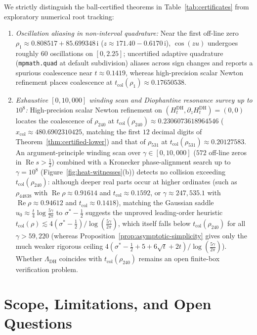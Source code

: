 \documentclass[11pt,a4paper,reqno]{amsart}
\theoremstyle{definition}
\theoremstyle{remark}
\numberwithin{equation}{section}
\newcommand{\ii}{\mathrm{i}}
\DeclareMathOperator{\Reop}{Re}
\begin{document}
We strictly distinguish the ball-certified theorems in Table~\ref{tab:certificates} from exploratory numerical root tracking:
\begin{enumerate}[label=\textup{(\arabic*)},leftmargin=2.0em]
  \item \emph{Oscillation aliasing in non-interval quadrature:} Near the first off-line zero $\rho_1 \approx 0.808517 + 85.699348\,\ii$ ($z \approx 171.40 - 0.6170\,\ii$), $\cos(zu)$ undergoes roughly $60$ oscillations on $[0, 2.25]$; uncertified adaptive quadrature (\texttt{mpmath.quad} at default subdivision) aliases across sign changes and reports a spurious coalescence near $t \approx 0.1419$, whereas high-precision scalar Newton refinement places coalescence at $t_{\mathrm{col}}(\rho_1) \approx 0.17650538$.
  \item \emph{Exhaustive $[0, 10{,}000]$ winding scan and Diophantine resonance survey up to $10^8$:} High-precision scalar Newton refinement on $(H_t^{\mathrm{DH}}, \partial_z H_t^{\mathrm{DH}}) = (0,0)$ locates the coalescence of $\rho_{240}$ at $t_{\mathrm{col}}(\rho_{240}) \approx 0.2306073618964546$ ($x_{\mathrm{col}} \approx 480.6902310425$, matching the first $12$ decimal digits of Theorem~\ref{thm:certified-lower}) and that of $\rho_{531}$ at $t_{\mathrm{col}}(\rho_{531}) \approx 0.20127583$. An argument-principle winding scan over $\gamma \in [0, 10{,}000]$ ($572$ off-line zeros in $\Reop s > \frac{1}{2}$) combined with a Kronecker phase-alignment search up to $\gamma = 10^8$ (Figure~\ref{fig:heat-witnesses}(b)) detects no collision exceeding $t_{\mathrm{col}}(\rho_{240})$: although deeper real parts occur at higher ordinates (such as $\rho_{44838}$ with $\Reop\rho \approx 0.91614$ and $t_{\mathrm{col}} \approx 0.1592$, or $\gamma \approx 247{,}535.1$ with $\Reop\rho \approx 0.94612$ and $t_{\mathrm{col}} \approx 0.1418$), matching the Gaussian saddle $u_0 \approx \frac{t}{4}\log\frac{5\gamma}{2\pi}$ to $\sigma^* - \frac{1}{2}$ suggests the unproved leading-order heuristic $t_{\mathrm{col}}(\rho) \lesssim 4(\sigma^* - \frac{1}{2})/\log(\frac{5\gamma}{2\pi})$, which itself falls below $t_{\mathrm{col}}(\rho_{240})$ for all $\gamma > 59{,}220$ (whereas Proposition~\ref{prop:asymptotic-simplicity} gives only the much weaker rigorous ceiling $4(\sigma^* - \frac{1}{2} + 5 + 6\sqrt{t} + 2t)/\log(\frac{5\gamma}{2\pi})$). Whether $\Lambda_{\mathrm{DH}}$ coincides with $t_{\mathrm{col}}(\rho_{240})$ remains an open finite-box verification problem.
\end{enumerate}

\section{Scope, Limitations, and Open Questions}
\label{sec:conclusion}
\end{document}
